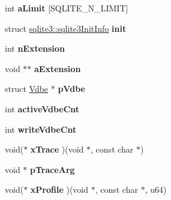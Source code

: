 \begin{DoxyCompactItemize}
\item 
\hypertarget{structsqlite3_ad8acf663e1619905094c9dfe4125157b}{int {\bfseries a\-Limit} \mbox{[}S\-Q\-L\-I\-T\-E\-\_\-\-N\-\_\-\-L\-I\-M\-I\-T\mbox{]}}\label{structsqlite3_ad8acf663e1619905094c9dfe4125157b}

\item 
\hypertarget{structsqlite3_a14bb7fbfa6b662021069fcdf6b334d70}{struct \hyperlink{structsqlite3_1_1sqlite3_init_info}{sqlite3\-::sqlite3\-Init\-Info} {\bfseries init}}\label{structsqlite3_a14bb7fbfa6b662021069fcdf6b334d70}

\item 
\hypertarget{structsqlite3_aa57fc38ef27d8fa59221cb5c0e54f7fb}{int {\bfseries n\-Extension}}\label{structsqlite3_aa57fc38ef27d8fa59221cb5c0e54f7fb}

\item 
\hypertarget{structsqlite3_aa97954113d8e35c97f8a3af534703f7b}{void $\ast$$\ast$ {\bfseries a\-Extension}}\label{structsqlite3_aa97954113d8e35c97f8a3af534703f7b}

\item 
\hypertarget{structsqlite3_a596f0301f43c5e25575c2a1403f8b571}{struct \hyperlink{struct_vdbe}{Vdbe} $\ast$ {\bfseries p\-Vdbe}}\label{structsqlite3_a596f0301f43c5e25575c2a1403f8b571}

\item 
\hypertarget{structsqlite3_ada07202e7fd80f275e2e5063d96b5cb0}{int {\bfseries active\-Vdbe\-Cnt}}\label{structsqlite3_ada07202e7fd80f275e2e5063d96b5cb0}

\item 
\hypertarget{structsqlite3_a632e51f8d35c1e8802639661e2fcd567}{int {\bfseries write\-Vdbe\-Cnt}}\label{structsqlite3_a632e51f8d35c1e8802639661e2fcd567}

\item 
\hypertarget{structsqlite3_ae438713860c36ad393eb28702b67fec5}{void($\ast$ {\bfseries x\-Trace} )(void $\ast$, const char $\ast$)}\label{structsqlite3_ae438713860c36ad393eb28702b67fec5}

\item 
\hypertarget{structsqlite3_ae0920576e4e92f1b736255fcfad649d1}{void $\ast$ {\bfseries p\-Trace\-Arg}}\label{structsqlite3_ae0920576e4e92f1b736255fcfad649d1}

\item 
\hypertarget{structsqlite3_aa02bf4f3ffdaf52d43a3668661903ffb}{void($\ast$ {\bfseries x\-Profile} )(void $\ast$, const char $\ast$, u64)}\label{structsqlite3_aa02bf4f3ffdaf52d43a3668661903ffb}


\end{DoxyCompactItemize}
